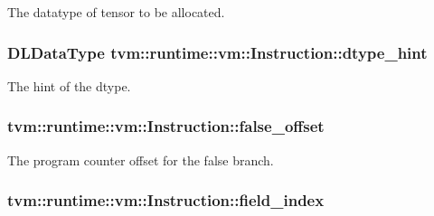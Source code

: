 The datatype of tensor to be allocated. 

\subsubsection[{\texorpdfstring{dtype\+\_\+hint}{dtype_hint}}]{\setlength{\rightskip}{0pt plus 5cm}D\+L\+Data\+Type tvm\+::runtime\+::vm\+::\+Instruction\+::dtype\+\_\+hint}\hypertarget{structtvm_1_1runtime_1_1vm_1_1Instruction_a0f48c1e04fe9ba735576bef37caf9cce}{}\label{structtvm_1_1runtime_1_1vm_1_1Instruction_a0f48c1e04fe9ba735576bef37caf9cce}


The hint of the dtype. 

\subsubsection[{\texorpdfstring{false\+\_\+offset}{false_offset}}]{ tvm\+::runtime\+::vm\+::\+Instruction\+::false\+\_\+offset}\hypertarget{structtvm_1_1runtime_1_1vm_1_1Instruction_a20f3b29da9e03f2fa6977743c30a02de}{}\label{structtvm_1_1runtime_1_1vm_1_1Instruction_a20f3b29da9e03f2fa6977743c30a02de}


The program counter offset for the false branch. 

\subsubsection[{\texorpdfstring{field\+\_\+index}{field_index}}]{ tvm\+::runtime\+::vm\+::\+Instruction\+::field\+\_\+index}\hypertarget{structtvm_1_1runtime_1_1vm_1_1Instruction_a623d715b7b22a5fa853e8d000a6f1ecd}{}\label{structtvm_1_1runtime_1_1vm_1_1Instruction_a623d715b7b22a5fa853e8d000a6f1ecd}


